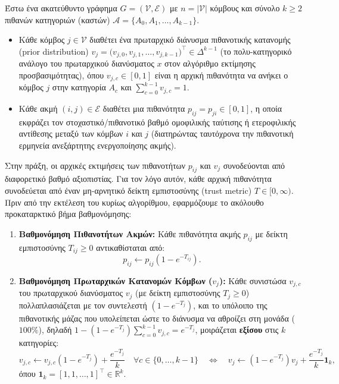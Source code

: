 \documentclass[11pt, a4paper]{article}
\theoremstyle{definition}
\theoremstyle{definition}
\begin{document}
Έστω ένα ακατεύθυντο γράφημα $G = (\mathcal{V}, \mathcal{E})$ με $n = |\mathcal{V}|$ κόμβους και σύνολο $k \ge 2$ πιθανών κατηγοριών (καστών) $\mathcal{A} = \{A_0, A_1, \dots, A_{k-1}\}$.
\begin{itemize}
\item Κάθε κόμβος $j \in \mathcal{V}$ διαθέτει ένα πρωταρχικό διάνυσμα πιθανοτικής κατανομής (prior distribution) $v_j = \big(v_{j,0}, v_{j,1}, \dots, v_{j,k-1}\big)^\top \in \Delta^{k-1}$ (το πολυ-κατηγορικό ανάλογο του πρωταρχικού διανύσματος $x$ στον αλγόριθμο εκτίμησης προσβασιμότητας), όπου $v_{j,c} \in [0,1]$ είναι η αρχική πιθανότητα να ανήκει ο κόμβος $j$ στην κατηγορία $A_c$ και $\sum_{c=0}^{k-1} v_{j,c} = 1$.
\item Κάθε ακμή $(i, j) \in \mathcal{E}$ διαθέτει μια πιθανότητα $p_{ij} = p_{ji} \in [0, 1]$, η οποία εκφράζει τον στοχαστικό/πιθανοτικό βαθμό ομοφιλικής ταύτισης ή ετεροφιλικής αντίθεσης μεταξύ των κόμβων $i$ και $j$ (διατηρώντας ταυτόχρονα την πιθανοτική ερμηνεία ανεξάρτητης ενεργοποίησης ακμής).
\end{itemize}

Στην πράξη, οι αρχικές εκτιμήσεις των πιθανοτήτων $p_{ij}$ και $v_j$ συνοδεύονται από διαφορετικό βαθμό αξιοπιστίας. Για τον λόγο αυτόν, κάθε αρχική πιθανότητα συνοδεύεται από έναν μη-αρνητικό δείκτη εμπιστοσύνης (trust metric) $T \in [0, \infty)$. Πριν από την εκτέλεση του κυρίως αλγορίθμου, εφαρμόζουμε το ακόλουθο προκαταρκτικό βήμα βαθμονόμησης:

\begin{enumerate}[label=\textbf{\arabic*.}]
\item \textbf{Βαθμονόμηση Πιθανοτήτων Ακμών:} Κάθε πιθανότητα ακμής $p_{ij}$ με δείκτη εμπιστοσύνης $T_{ij} \ge 0$ αντικαθίσταται από:
\begin{equation}\label{eq:edge_trust_gr}
p_{ij} \leftarrow p_{ij}\left(1 - e^{-T_{ij}}\right).
\end{equation}
\item \textbf{Βαθμονόμηση Πρωταρχικών Κατανομών Κόμβων ($v_j$):} Κάθε συνιστώσα $v_{j,c}$ του πρωταρχικού διανύσματος $v_j$ (με δείκτη εμπιστοσύνης $T_j \ge 0$) πολλαπλασιάζεται με τον συντελεστή $\left(1 - e^{-T_j}\right)$, και το υπόλοιπο της πιθανοτικής μάζας που υπολείπεται ώστε το διάνυσμα να αθροίζει στη μονάδα ($100\%$), δηλαδή $1 - \left(1 - e^{-T_j}\right)\sum_{c=0}^{k-1} v_{j,c} = e^{-T_j}$, μοιράζεται \textbf{εξίσου} στις $k$ κατηγορίες:
\begin{equation}\label{eq:prior_trust_gr}
v_{j,c} \leftarrow v_{j,c}\left(1 - e^{-T_j}\right) + \frac{e^{-T_j}}{k} \quad \forall c \in \{0, \dots, k-1\} \quad \Longleftrightarrow \quad v_j \leftarrow \left(1 - e^{-T_j}\right)v_j + \frac{e^{-T_j}}{k}\mathbf{1}_k,
\end{equation}
όπου $\mathbf{1}_k = [1, 1, \dots, 1]^\top \in \mathbb{R}^k$.
\end{enumerate}
\end{document}
